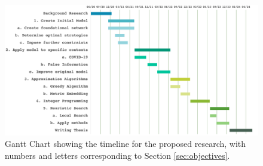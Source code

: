 \documentclass[hidelinks,a4paper,11pt]{article}
\numberwithin{equation}{section}
\begin{document}
\begin{figure}[ht]
  \includegraphics[width=\linewidth]{timeline.png}
  \caption{Gantt Chart showing the timeline for the proposed research, with numbers and letters corresponding to Section \ref{sec:objectives}.}
  \label{fig:timeline}
\end{figure}


\newpage
{}



\nocite{*}
\end{document}
